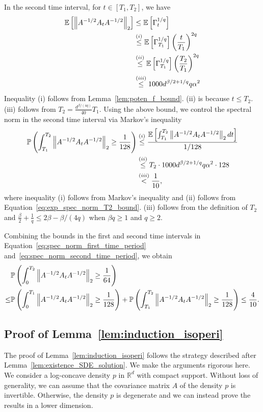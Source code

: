 \documentclass[11pt,twoside]{article}
\newcommand{\co}{A}
\newcommand{\potentwo}{\Gamma}
\theoremstyle{named}
\theoremstyle{plain}
\newcommand{\vecnorm}[2]{\left\| #1\right\|_{#2}}
\newcommand{\Exs}{\ensuremath{{\mathbb{E}}}}
\newcommand{\Prob}{\ensuremath{{\mathbb{P}}}}
\newcommand{\usedim}{\ensuremath{d}}
\newcommand{\dims}{\usedim}
\newcommand{\real}{\ensuremath{\mathbb{R}}}
\newcommand{\brackets}[1]{\left[ #1 \right]}
\newcommand{\parenth}[1]{\left( #1 \right)}
\begin{document}
In the second time interval, for $t \in [T_1, T_2]$, we have
\begin{align}
  \label{eq:exp_spec_norm_T2_bound}
  \Exs\brackets{\vecnorm{\co^{-1/2} A_{t} \co^{-1/2}}{2}} &\leq \Exs\brackets{\potentwo_{t}^{1/q}} \notag \\
  &\stackrel{(i)}{\leq} \Exs\brackets{\potentwo_{T_1}^{1/q}} \parenth{\frac{t}{T_1}}^{2q} \notag \\
  &\stackrel{(ii)}{\leq} \Exs\brackets{\potentwo_{T_1}^{1/q}} \parenth{\frac{T_2}{T_1}}^{2q} \notag \\
  &\stackrel{(iii)}{\leq} 1000 \dims^{\beta/2 + 1/q} q \alpha^2
\end{align}
Inequality (i) follows from Lemma~\ref{lem:poten_f_bound}. (ii) is because $t \leq T_2$. (iii) follows from $T_2 = \frac{\dims^{\beta/(4q)}}{40} T_1$.
Using the above bound, we control the spectral norm in the second time interval via Markov's inequality
\begin{align}
  \label{eq:spec_norm_second_time_period}
  \Prob\parenth{\int_{T_1}^{T_2} \vecnorm{\co^{-1/2}A_t \co^{-1/2}}{2} \geq \frac{1}{128}}
  &\stackrel{(i)}{\leq} \frac{\Exs \brackets{\int_{T_1}^{T_2} \vecnorm{\co^{-1/2}A_t \co^{-1/2}}{2} dt } }{1/128} \notag \\
  &\stackrel{(ii)}{\leq} T_2 \cdot 1000 \dims^{\beta/2 + 1/q} q \alpha^2 \cdot 128 \notag \\
  &\stackrel{(iii)}{<} \frac{1}{10},
\end{align}
where inequality (i) follows from Markov's inequality and (ii) follows from Equation~\eqref{eq:exp_spec_norm_T2_bound}. (iii) follows from the definition of $T_2$ and $\frac{\beta}{2}+\frac{1}{q} \leq 2\beta-\beta/(4q)$ when $\beta q \geq 1$ and $q \geq 2$.

Combining the bounds in the first and second time intervals in Equation~\eqref{eq:spec_norm_first_time_period} and~\eqref{eq:spec_norm_second_time_period}, we obtain
\begin{align}
  &\Prob\parenth{\int_{0}^{T_2} \vecnorm{\co^{-1/2}A_t \co^{-1/2}}{2} \geq \frac{1}{64}} \notag \\
  \leq & \Prob\parenth{\int_{0}^{T_1} \vecnorm{\co^{-1/2}A_t \co^{-1/2}}{2} \geq \frac{1}{128}} + \Prob\parenth{\int_{T_1}^{T_2} \vecnorm{\co^{-1/2}A_t \co^{-1/2}}{2} \geq \frac{1}{128}} \leq \frac{4}{10}.
\end{align}


\subsection{Proof of Lemma~\ref{lem:induction_isoperi}} %
\label{sub:proof_of_lemma_lem:induction_isoperi}
The proof of Lemma~\ref{lem:induction_isoperi} follows the strategy described after Lemma~\ref{lem:existence_SDE_solution}. We make the arguments rigorous here. We consider a log-concave density $p$ in $\real^\dims$ with compact support. Without loss of generality, we can assume that the covariance matrix $A$ of the density $p$ is invertible. Otherwise, the density $p$ is degenerate and we can instead prove the results in a lower dimension.
\end{document}
